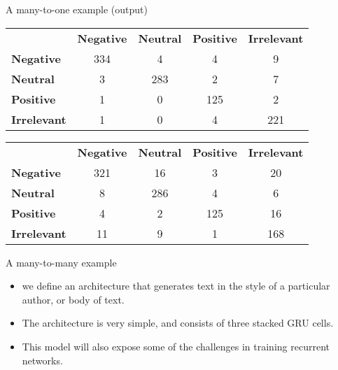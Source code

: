 \documentclass[10pt]{beamer}
\begin{document}
\begin{frame}{A many-to-one example (output)}
  \begin{center}
  \begin{tabular}{lcccc}
    {} & {\bf Negative} & {\bf Neutral} & {\bf Positive} & {\bf Irrelevant}\\
    {\bf Negative}   & {334} & {4} & {4} & {9}\\
    {\bf Neutral}    & {3} & {283} & {2} & {7}\\
    {\bf Positive}   & {1} & {0} & {125} & {2}\\
    {\bf Irrelevant} & {1} & {0} & {4} & {221}\\
  \end{tabular}
\end{center}
%
%
  \begin{center}
  \begin{tabular}{lcccc}
    {} & {\bf Negative} & {\bf Neutral} & {\bf Positive} & {\bf Irrelevant}\\
    {\bf Negative}   & {321} & {16} & {3} & {20}\\
    {\bf Neutral}    & {8} & {286} & {4} & {6}\\
    {\bf Positive}   & {4} & {2} & {125} & {16}\\
    {\bf Irrelevant} & {11} & {9} & {1} & {168}\\
  \end{tabular}
\end{center}
\end{frame}



\begin{frame}{A many-to-many example}
  \begin{itemize}
    \item we define an architecture that generates text in the style of a particular author, or body of text.
    \item The architecture is very simple, and consists of three stacked GRU cells.
    \item This model will also expose some of the challenges in training recurrent networks.
  \end{itemize}
\end{frame}
\end{document}
